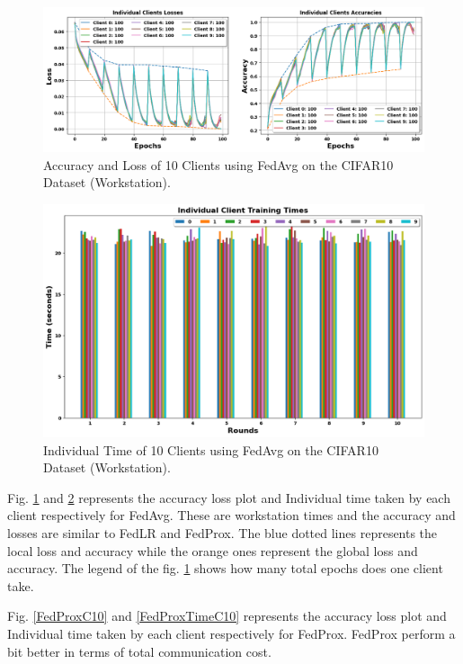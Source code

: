 \documentclass[conference]{IEEEtran}
\begin{document}
\begin{figure}[htp!]
	\centering
	\includegraphics[scale=.28]{Images/NEWGRAPHS/5.png }
	\caption{Accuracy and Loss of 10 Clients using FedAvg on the CIFAR10 Dataset (Workstation).}
	\label{FedAvgC10}
\end{figure}

\begin{figure}[htp!]
	\centering
	\includegraphics[scale=.3]{Images/NEWGRAPHS/6.png }
	\caption{Individual Time of 10 Clients using FedAvg on the CIFAR10 Dataset (Workstation).}
	\label{FedAvgTimeC10}
\end{figure}

Fig. \ref{FedAvgC10} and \ref{FedAvgTimeC10} represents the accuracy loss plot and Individual time taken by each client respectively for FedAvg.  These are workstation times and the accuracy and losses are similar to FedLR and FedProx. The blue dotted lines represents the local loss and accuracy while the orange ones represent the global loss and accuracy. The legend of the fig. \ref{FedAvgC10} shows how many total epochs does one client take.

Fig. \ref{FedProxC10} and \ref{FedProxTimeC10}  represents the accuracy loss plot and Individual time taken by each client respectively for FedProx. FedProx perform a bit better in terms of total communication cost.
%
\end{document}
